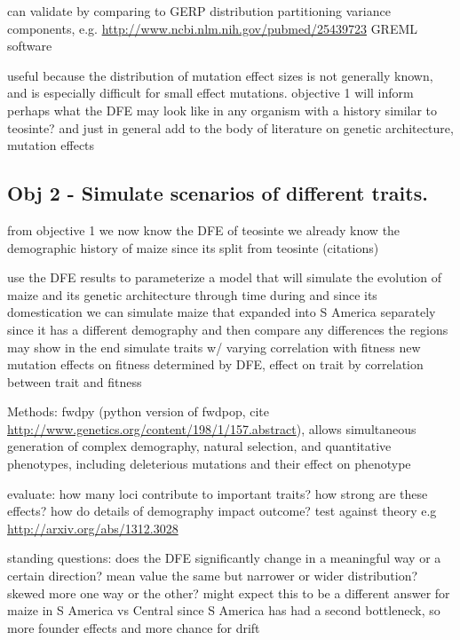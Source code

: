 	can validate by comparing to
		GERP distribution
		partitioning variance components, e.g. \url{http://www.ncbi.nlm.nih.gov/pubmed/25439723}
		GREML software
				

	useful because the distribution of mutation effect sizes is not generally known, and is especially difficult for small effect mutations.
	objective 1 will inform perhaps what the DFE may look like in any organism with a history similar to teosinte? 
	and just in general add to the body of literature on genetic architecture, mutation effects

	
\subsection{Obj 2 - Simulate scenarios of different traits.}
	
	from objective 1 we now know the DFE of teosinte
	we already know the demographic history of maize since its split from teosinte (citations)
	
	use the DFE results to parameterize a model that will simulate the evolution of maize and its genetic architecture through time during and since its domestication
	we can simulate maize that expanded into S America separately since it has a different demography and then compare any differences the regions may show in the end
		simulate traits w/ varying correlation with fitness
		new mutation effects on fitness determined by DFE, effect on trait by correlation between trait and fitness
	
	Methods: fwdpy (python version of fwdpop, cite \url{http://www.genetics.org/content/198/1/157.abstract}), allows simultaneous generation of complex demography, natural selection, and quantitative phenotypes, including deleterious mutations and their effect on phenotype
	
	evaluate:
		how many loci contribute to important traits?
		how strong are these effects?
		how do details of demography impact outcome?
		test against theory e.g \url{http://arxiv.org/abs/1312.3028}
	
	standing questions:
		does the DFE significantly change in a meaningful way or a certain direction?
			mean value the same but narrower or wider distribution?
			skewed more one way or the other?
		might expect this to be a different answer for maize in S America vs Central since S America has had a second bottleneck, so more founder effects and more chance for drift
	
